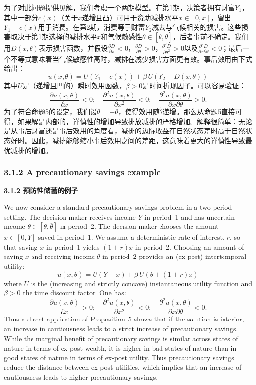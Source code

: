 \documentclass[12pt,a4paper]{article}
\newenvironment{original}
  {\par\noindent\ignorespaces}
  {\par}
\newenvironment{translation}
  {\par\noindent{\color{transblue}\ignorespaces}}
  {\par\medskip}
\begin{document}
\begin{translation}
为了对此问题提供见解，我们考虑一个两期模型。在第1期，决策者拥有财富$Y_{1}$，其中一部分$c(x)$（关于$x$递增且凸）可用于资助减排水平$x \in [0, \overline{x}]$，留出$Y_{1} - c(x)$用于消费。在第2期，消费等于财富$Y_{2}$减去与气候相关的损害。这些损害取决于第1期选择的减排水平$x$和气候敏感性$\theta \in [\underline{\theta}, \overline{\theta}]$，后者事前不确定。我们用$D(x, \theta)$表示损害函数，并假设$\frac{\partial D}{\partial x} < 0$，$\frac{\partial D}{\partial \theta} > 0$，$\frac{\partial^{2} D}{\partial \theta^{2}} > 0$以及$\frac{\partial^{2} D}{\partial x \partial \theta} < 0$；最后一个不等式意味着当气候敏感性高时，减排在减少损害方面更有效。事后效用由下式给出：
\[
u(x, \theta) = U(Y_{1} - c(x)) + \beta \, U(Y_{2} - D(x, \theta))
\]
其中$U$是（递增且凹的）瞬时效用函数，$\beta > 0$是时间折现因子。可以容易验证：
\[
\frac{\partial u(x,\theta)}{\partial x} < 0; \quad \frac{\partial^{2} u(x,\theta)}{\partial x^{2}} < 0; \quad \frac{\partial^{2} u(x,\theta)}{\partial x \partial \theta} > 0.
\]
为了符合命题5的设定，我们设$\tilde{\theta} = -\theta$，使得效用随$\tilde{\theta}$递增。那么从命题5直接可得，如果解是内部的，谨慎性的增加导致排放减排的严格增加。解释很简单：无论是从事后财富还是事后效用的角度看，减排的边际收益在自然状态差时高于自然状态好时。因此，减排能够缩小事后效用之间的差距，这意味着更大的谨慎性导致最优减排的增加。
\end{translation}

\subsubsection{3.1.2 A precautionary savings example}
{\color{transblue}\textbf{3.1.2 预防性储蓄的例子}}

\begin{original}
We now consider a standard precautionary savings problem in a two-period setting. The decision-maker receives income $Y$ in period~1 and has uncertain income $\theta \in [\underline{\theta}, \overline{\theta}]$ in period~2. The decision-maker chooses the amount $x \in [0, Y]$ saved in period~1. We assume a deterministic rate of interest, $r$, so that saving $x$ in period~1 yields $(1+r)x$ in period~2. Choosing an amount of saving $x$ and receiving income $\theta$ in period~2 provides an (ex-post) intertemporal utility:
\[
u(x, \theta) = U(Y - x) + \beta \, U(\theta + (1+r)x)
\]
where $U$ is the (increasing and strictly concave) instantaneous utility function and $\beta > 0$ the time discount factor. One has:
\[
\frac{\partial u(x,\theta)}{\partial x} > 0; \quad \frac{\partial^{2} u(x,\theta)}{\partial x^{2}} < 0; \quad \frac{\partial^{2} u(x,\theta)}{\partial x \partial \theta} < 0.
\]
Thus a direct application of Proposition~5 shows that if the solution is interior, an increase in cautiousness leads to a strict increase of precautionary savings. While the marginal benefit of precautionary savings is similar across states of nature in terms of ex-post wealth, it is higher in bad states of nature than in good states of nature in terms of ex-post utility. Thus precautionary savings reduce the distance between ex-post utilities, which implies that an increase of cautiousness leads to higher precautionary savings.
\end{original}
\end{document}
